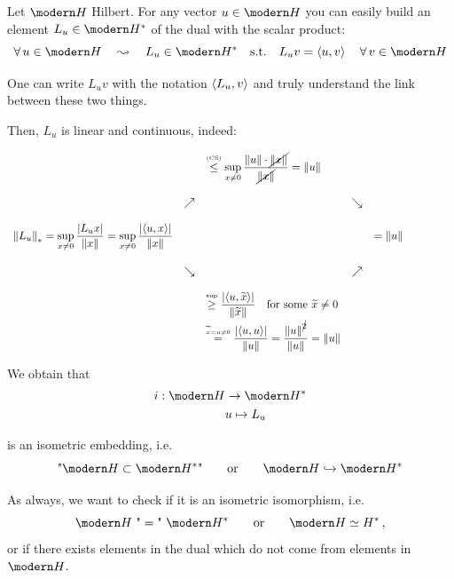 Let $\Hc$ Hilbert. For any vector $u\in\Hc$ you can easily build an element $L_u\in\Hc^*$ of the dual with the scalar product:
\begin{equation*}
\forall u\in \Hc\quad \leadsto\quad L_u\in \Hc^*\quad\text{s.t.}\quad L_u v =\sca{u,v}\quad\forall v\in\Hc
\end{equation*}

\begin{subtle}
One can write $L_uv$ with the notation $\left\langle L_u,v \right\rangle$ and truly understand the link between these two things.
\end{subtle}

Then, $L_u$ is linear and continuous, indeed:
\begin{equation}
\label{dual_norm_eq}
{\renewcommand*{\arraystretch}{2.5}
\begin{array}{lclcl}
& & \overset{\underset{(\text{CS})}{}}{\leq} \displaystyle\sup_{x\neq 0} \dfrac{\norm{u}\cdot\cancel{\norm{x}}}{\cancel{\norm{x}}}=\norm{u} & & \\
& \nearrow & & \searrow & \\
\norm{L_u}_*=\displaystyle\sup_{x\neq 0} \dfrac{\left|L_ux\right|}{\norm{x}}=\displaystyle\sup_{x\neq 0} \dfrac{\abs{\sca{u,x}}}{\norm{x}}  & & & & = \norm{u}\\
& \searrow & & \nearrow \\
& & \overset{\underset{\text{sup}}{}}{\geq} \dfrac{\abs{\sca{u,\widetilde{x}}}}{\norm{\widetilde{x}}}\quad\text{for some } \widetilde{x}\neq 0 & & \\
& & \overset{\underset{\widetilde{x}=u\neq 0}{}}{=} \dfrac{\abs{\sca{u,u}}}{\norm{u}}=\dfrac{\norm{u}^{\cancel{2}}}{\norm{u}}=\norm{u} & & 
\end{array}}\qquad\qquad
\end{equation}

We obtain that
\begin{align*}
i:\Hc &\to \Hc^* \\
& u\mapsto L_u
\end{align*}

is an isometric embedding, i.e.
\begin{equation*}
\text{"}\Hc\subset\Hc^*\text{"}\qquad\text{or}\qquad \Hc \hookrightarrow \Hc^*
\end{equation*}

As always, we want to check if it is an isometric isomorphism, i.e.
\begin{equation*}
\Hc\ \text{"}=\text{"}\ \Hc^*\qquad\text{or}\qquad\Hc\simeq H^*\,,
\end{equation*}
or if there exists elements in the dual which do not come from elements in $\Hc$.


